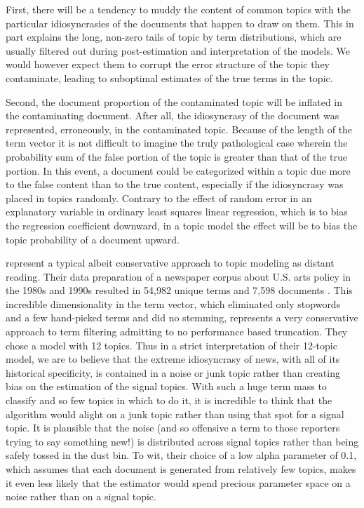 \documentclass[]{book}
\theoremstyle{definition}
\theoremstyle{definition}
\theoremstyle{definition}
\theoremstyle{remark}
\begin{document}
First, there will be a tendency to muddy the content of common topics
with the particular idiosyncrasies of the documents that happen to draw
on them. This in part explains the long, non-zero tails of topic by term
distributions, which are usually filtered out during post-estimation and
interpretation of the models. We would however expect them to corrupt
the error structure of the topic they contaminate, leading to suboptimal
estimates of the true terms in the topic.

Second, the document proportion of the contaminated topic will be
inflated in the contaminating document. After all, the idiosyncrasy of
the document was represented, erroneously, in the contaminated topic.
Because of the length of the term vector it is not difficult to imagine
the truly pathological case wherein the probability sum of the false
portion of the topic is greater than that of the true portion. In this
event, a document could be categorized within a topic due more to the
false content than to the true content, especially if the idiosyncrasy
was placed in topics randomly. Contrary to the effect of random error in
an explanatory variable in ordinary least squares linear regression,
which is to bias the regression coefficient downward, in a topic model
the effect will be to bias the topic probability of a document upward.

\citet{DiMaggio2013Exploiting} represent a typical albeit conservative
approach to topic modeling as distant reading. Their data preparation of
a newspaper corpus about U.S. arts policy in the 1980s and 1990s
resulted in 54,982 unique terms and 7,598 documents
\citeyearpar[582]{DiMaggio2013Exploiting}. This incredible
dimensionality in the term vector, which eliminated only stopwords and a
few hand-picked terms and did no stemming, represents a very
conservative approach to term filtering admitting to no performance
based truncation. They chose a model with 12 topics. Thus in a strict
interpretation of their 12-topic model, we are to believe that the
extreme idiosyncrasy of news, with all of its historical specificity, is
contained in a noise or junk topic rather than creating bias on the
estimation of the signal topics. With such a huge term mass to classify
and so few topics in which to do it, it is incredible to think that the
algorithm would alight on a junk topic rather than using that spot for a
signal topic. It is plausible that the noise (and so offensive a term to
those reporters trying to say something new!) is distributed across
signal topics rather than being safely tossed in the dust bin. To wit,
their choice of a low alpha parameter of 0.1, which assumes that each
document is generated from relatively few topics, makes it even less
likely that the estimator would spend precious parameter space on a
noise rather than on a signal topic.
\end{document}
